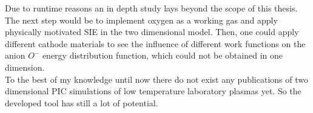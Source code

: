 Due to runtime reasons an in depth study lays beyond the scope of this thesis.\\
The next step would be to implement oxygen as a working gas and apply physically motivated SIE in the two dimensional model.
Then, one could apply different cathode materials to see the influence of different work functions on the anion $O^-$ energy distribution function, which could not be obtained in one dimension.\\
To the best of my knowledge until now there do not exist any publications of two dimensional PIC simulations of low temperature laboratory plasmas yet.
So the developed tool has still a lot of potential.\\



